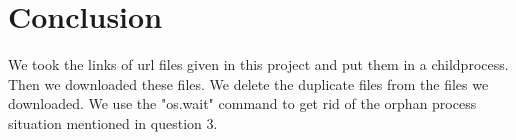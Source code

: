 \documentclass[onecolumn]{article}
\begin{document}
\section{Conclusion}
We took the links of url files given in this project and put them in a childprocess. Then we downloaded these files. We delete the duplicate files from the files we downloaded. We use the "os.wait" command to get rid of the orphan process situation mentioned in question 3.


\nocite{*}


\end{document}
